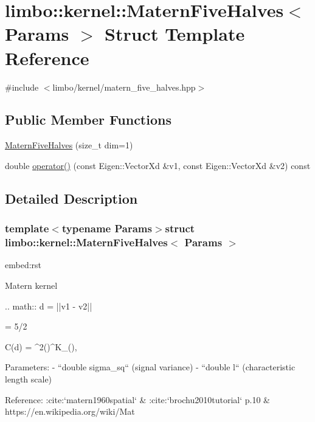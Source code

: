 \hypertarget{structlimbo_1_1kernel_1_1_matern_five_halves}{}\section{limbo\+:\+:kernel\+:\+:Matern\+Five\+Halves$<$ Params $>$ Struct Template Reference}
\label{structlimbo_1_1kernel_1_1_matern_five_halves}


{\ttfamily \#include $<$limbo/kernel/matern\+\_\+five\+\_\+halves.\+hpp$>$}

\subsection*{Public Member Functions}
\begin{DoxyCompactItemize}
\item 
\hyperlink{structlimbo_1_1kernel_1_1_matern_five_halves_ad574e55051fb4728271945cb46ea11f0}{Matern\+Five\+Halves} (size\+\_\+t dim=1)
\item 
double \hyperlink{structlimbo_1_1kernel_1_1_matern_five_halves_a2949874230e0cd3f8116de67c3824987}{operator()} (const Eigen\+::\+Vector\+Xd \&v1, const Eigen\+::\+Vector\+Xd \&v2) const 
\end{DoxyCompactItemize}


\subsection{Detailed Description}
\subsubsection*{template$<$typename Params$>$struct limbo\+::kernel\+::\+Matern\+Five\+Halves$<$ Params $>$}

\begin{DoxyVerb}embed:rst

Matern kernel

.. math::
  d = ||v1 - v2||

  \nu = 5/2

  C(d) = \sigma^2\Bigg(\sqrt{2\nu}\Bigg)^\nu K_\nu\Bigg(\sqrt{2\nu}\Bigg),


Parameters:
  - ``double sigma_sq`` (signal variance)
  - ``double l`` (characteristic length scale)

Reference: :cite:`matern1960spatial` & :cite:`brochu2010tutorial` p.10 & https://en.wikipedia.org/wiki/Mat%
\end{DoxyVerb}
 

